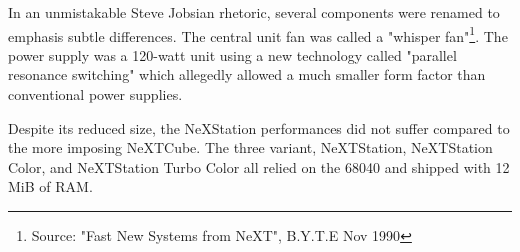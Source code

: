 \par
\vspace{-5pt}
In an unmistakable Steve Jobsian rhetoric, several components were renamed to emphasis subtle differences. The central unit fan was called a "whisper fan"\footnote{Source: "Fast New Systems from NeXT", B.Y.T.E Nov 1990}.  The power supply was a 120-watt unit using a new technology called "parallel resonance switching" which allegedly allowed a much smaller form factor than conventional power supplies.\\
\par
Despite its reduced size, the NeXStation performances did not suffer compared to the more imposing NeXTCube. The three variant, NeXTStation, NeXTStation Color, and NeXTStation Turbo Color all relied on the 68040 and shipped with 12 MiB of RAM.\\
\par
{}
\pagebreak










